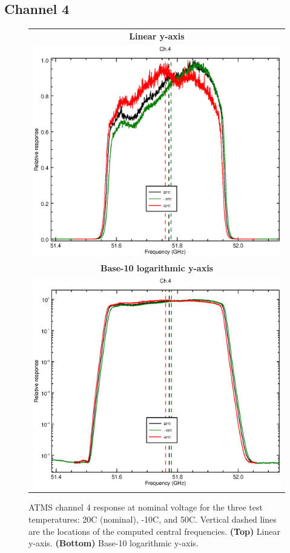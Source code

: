 \subsection{Channel 4}
\begin{figure}[H]
  \label{fig:Tset.ch4_response}
  \centering
  \begin{tabular}{c}
    \hspace{1.75cm}\sffamily\textbf{Linear y-axis} \\
    \includegraphics[scale=0.55]{graphics/srf/Tset/lin/atms_npp-4.eps} \\
    \hspace{1.75cm}\sffamily\textbf{Base-10 logarithmic y-axis} \\
    \includegraphics[scale=0.55]{graphics/srf/Tset/log/atms_npp-4.eps}
  \end{tabular}
  \caption{ATMS channel 4 response at nominal voltage for the three test temperatures: 20\textdegree{}C (nominal), -10\textdegree{}C, and 50\textdegree{}C. Vertical dashed lines are the locations of the computed central frequencies. \textbf{(Top)} Linear y-axis. \textbf{(Bottom)} Base-10 logarithmic y-axis.}
\end{figure}

